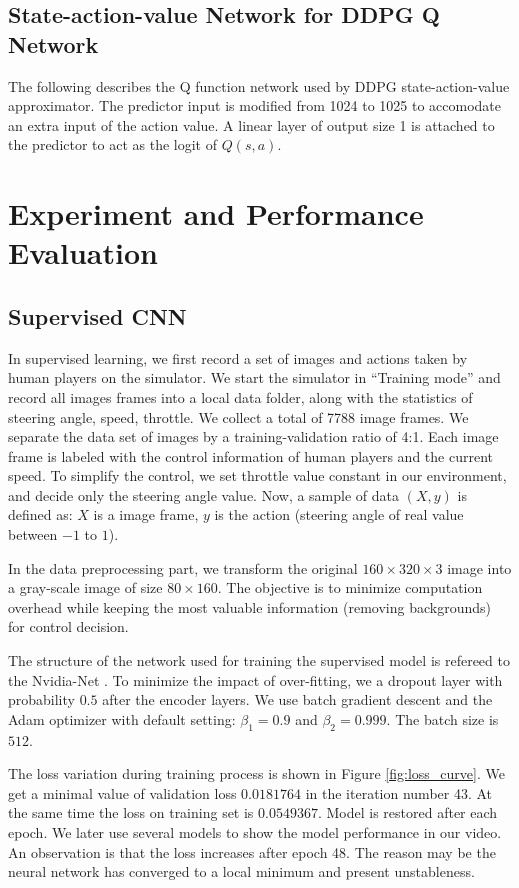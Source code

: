 \documentclass[a4paper]{article}
\begin{document}
\subsection{State-action-value Network for DDPG Q Network}
The following describes the Q function network used by DDPG state-action-value approximator. The predictor input is modified from 1024 to 1025 to accomodate an extra input of the action value. A linear layer of output size 1 is attached to the predictor to act as the logit of $Q(s,a)$.


\section{Experiment and Performance Evaluation}
\subsection{Supervised CNN}

In supervised learning, we first record a set of images and actions taken by human players on the
simulator. We start the simulator in ``Training mode'' and record all images frames into a local
data folder, along with the statistics of steering angle, speed, throttle. We collect a total
of 7788 image frames. We separate the  data set of images by a training-validation ratio of 4:1. Each image frame is labeled
with the control information of human players and the current speed. To simplify the control, 
we set throttle value constant in our environment, and decide only the steering angle value. Now, a sample of data $(X, y)$ is defined as: $X$
is a image frame, $y$ is the action (steering angle of real value between $-1$ to $1$).

In the data preprocessing part, we transform the original $160 \times 320 \times 3$ image into a gray-scale image of size $80 \times 160$.
The objective is to minimize computation overhead while keeping the most valuable information (removing backgrounds) for control decision.

The structure of the network used for training the supervised model
is refereed to the Nvidia-Net \cite{bojarski2016end}.  To minimize the impact of over-fitting, we a dropout layer with probability $0.5$
after the encoder layers.
We use batch gradient descent and the Adam optimizer with default setting:
$\beta_1=0.9$ and $\beta_2=0.999$. The batch size is $512$.

The loss variation during training process is shown in Figure \ref{fig:loss_curve}. We get a minimal value of validation loss
$0.0181764$
in the iteration number 43. At the same time the loss on training set is $0.0549367$. Model is restored after each epoch. We later use
several models to show the model performance in our video.
An observation is that the loss increases
after epoch 48. The reason may be the neural network has converged to a local minimum and present unstableness.
\end{document}
